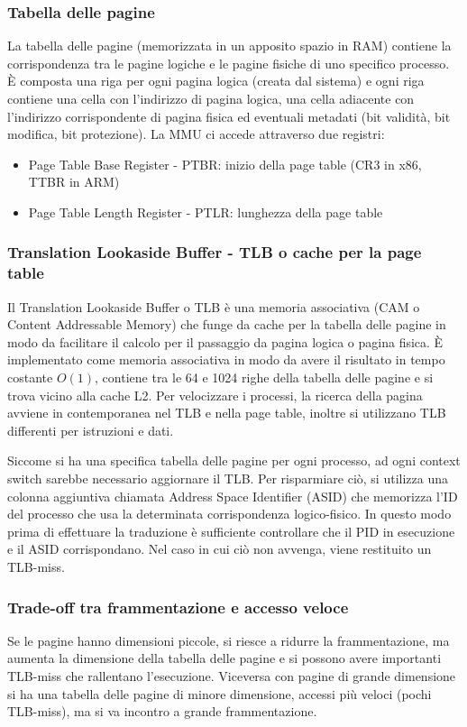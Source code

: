 \documentclass[a4paper]{article}
\begin{document}
\subsubsection*{Tabella delle pagine}
La tabella delle pagine (memorizzata in un apposito spazio in RAM) contiene la corrispondenza tra le pagine logiche e le pagine
fisiche di uno specifico processo. È composta una riga per ogni pagina logica (creata dal sistema) e ogni riga contiene una cella
con l'indirizzo di pagina logica, una cella adiacente con l'indirizzo corrispondente di pagina fisica ed eventuali metadati (bit
validità, bit modifica, bit protezione). La MMU ci accede attraverso due registri:
\begin{itemize}
	\item Page Table Base Register - PTBR: inizio della page table (CR3 in x86, TTBR in ARM)
	\item Page Table Length Register - PTLR: lunghezza della page table
\end{itemize}

\subsubsection*{Translation Lookaside Buffer - TLB o cache per la page table}
Il Translation Lookaside Buffer o TLB è una memoria associativa (CAM o Content Addressable Memory) che funge da cache per la
tabella delle pagine in modo da facilitare il calcolo per il passaggio da pagina logica o pagina fisica. È implementato come
memoria associativa in modo da avere il risultato in tempo costante \(O(1)\), contiene tra le 64 e 1024 righe della tabella
delle pagine e si trova vicino alla cache L2. Per velocizzare i processi, la ricerca della pagina avviene in contemporanea
nel TLB e nella page table, inoltre si utilizzano TLB differenti per istruzioni e dati.

Siccome si ha una specifica tabella delle pagine per ogni processo, ad ogni context switch sarebbe necessario aggiornare il
TLB. Per risparmiare ciò, si utilizza una colonna aggiuntiva chiamata Address Space Identifier (ASID) che memorizza l'ID del
processo che usa la determinata corrispondenza logico-fisico. In questo modo prima di effettuare la traduzione è sufficiente 
controllare che il PID in esecuzione e il ASID corrispondano. Nel caso in cui ciò non avvenga, viene restituito un TLB-miss.

\subsubsection*{Trade-off tra frammentazione e accesso veloce}
Se le pagine hanno dimensioni piccole, si riesce a ridurre la frammentazione, ma aumenta la dimensione della tabella delle pagine
e si possono avere importanti TLB-miss che rallentano l'esecuzione. Viceversa con pagine di grande dimensione si ha una tabella
delle pagine di minore dimensione, accessi più veloci (pochi TLB-miss), ma si va incontro a grande frammentazione.
\end{document}
